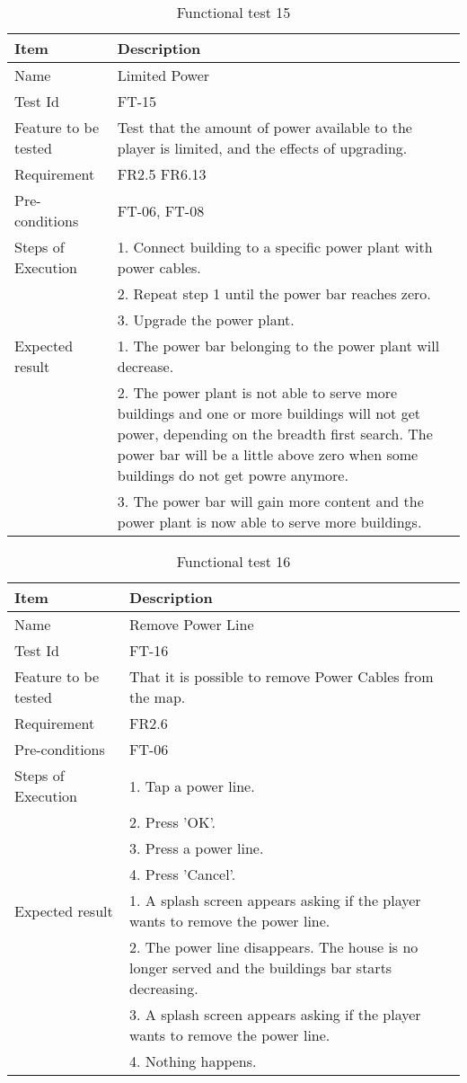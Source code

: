 \begin{table}[H]
\centering
	\begin{tabular}{ l | p{8cm} }
		\hline
		{\bf Item} & {\bf Description} \\ \hline
		Name & Limited Power \\ 
		Test Id & FT-15 \\ 
		Feature to be tested & Test that the amount of power available to the player is limited, and the effects of upgrading. \\ 
		Requirement & FR2.5 FR6.13 \\ 
		Pre-conditions & FT-06, FT-08 \\ 
		Steps of Execution & 1. Connect building to a specific power plant with power cables. \\
		& 2. Repeat step 1 until the power bar reaches zero. \\
		& 3. Upgrade the power plant. \\
		Expected result & 1. The power bar belonging to the power plant will decrease. \\
		& 2. The power plant is not able to serve more buildings and one or more buildings will not get power, depending on the breadth first search. The power bar will be a little above zero when some buildings do not get powre anymore. \\ 
		& 3. The power bar will gain more content and the power plant is now able to serve more buildings. \\
	\end{tabular}
	\caption{Functional test 15}
\end{table}

\begin{table}[H]
\centering
	\begin{tabular}{ l | p{8cm} }
		\hline
		{\bf Item} & {\bf Description} \\ \hline
		Name & Remove Power Line \\ 
		Test Id & FT-16 \\ 
		Feature to be tested & That it is possible to remove Power Cables from the map. \\ 
		Requirement & FR2.6 \\ 
		Pre-conditions & FT-06 \\ 
		Steps of Execution & 1. Tap a power line.  \\ 
		& 2. Press 'OK'. \\
		& 3. Press a power line. \\
		& 4. Press 'Cancel'. \\
		Expected result & 1. A splash screen appears asking if the player wants to remove the power line. \\ 
		& 2. The power line disappears. The house is no longer served and the buildings bar starts decreasing. \\
		& 3. A splash screen appears asking if the player wants to remove the power line. \\
		& 4. Nothing happens. \\
	\end{tabular}
	\caption{Functional test 16}
\end{table}



